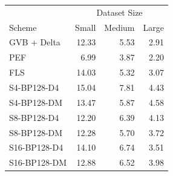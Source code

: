 \begin{tabular}{lrrr}
\toprule
 & \multicolumn{3}{c}{Dataset Size} \\
Scheme & Small & Medium & Large \\
\midrule
GVB + Delta & 12.33 & 5.53 & 2.91 \\
PEF & 6.99 & 3.87 & 2.20 \\
FLS & 14.03 & 5.32 & 3.07 \\
S4-BP128-D4 & 15.04 & 7.81 & 4.43 \\
S4-BP128-DM & 13.47 & 5.87 & 4.58 \\
S8-BP128-D4 & 12.20 & 6.39 & 4.13 \\
S8-BP128-DM & 12.28 & 5.70 & 3.72 \\
S16-BP128-D4 & 14.10 & 6.74 & 3.51 \\
S16-BP128-DM & 12.88 & 6.52 & 3.98 \\
\bottomrule
\end{tabular}
